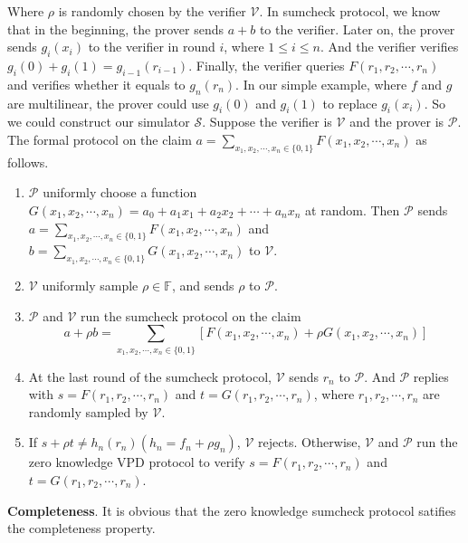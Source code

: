 Where $\rho$ is randomly chosen by the verifier $\mathcal{V}$. In sumcheck protocol, we know that in the beginning, the prover sends $a + b$ to the verifier. Later on, the prover sends $g_i(x_i)$ to the verifier in round $i$, where $1 \leq i \leq n$. And the verifier verifies $g_i(0) + g_i(1) = g_{i-1}(r_{i-1})$. Finally, the verifier queries $F(r_1, r_2, \cdots, r_n)$ and verifies whether it equals to $g_n(r_n)$. In our simple example, where $f$ and $g$ are multilinear, the prover could use $g_i(0)$ and $g_i(1)$ to replace $g_i(x_i)$. So we could construct our simulator $\mathcal{S}$. Suppose the verifier is $\mathcal{V}$ and the prover is $\mathcal{P}$. The formal protocol on the claim $a = \sum\limits_{x_1, x_2, \cdots, x_n \in \{0, 1\}} F(x_1, x_2, \cdots, x_n)$ as follows.\\

\noindent
\begin{enumerate}

\item $\mathcal{P}$ uniformly choose a function $G(x_1, x_2, \cdots, x_n) = a_0 + a_1x_1 + a_2x_2 + \cdots + a_nx_n$ at random. Then $\mathcal{P}$ sends $a = \sum\limits_{x_1, x_2, \cdots, x_n \in \{0, 1\}} F(x_1, x_2, \cdots, x_n)$ and $b = \sum\limits_{x_1, x_2, \cdots, x_n \in \{0, 1\}} G(x_1, x_2, \cdots, x_n)$ to $\mathcal{V}$.
\item $\mathcal{V}$ uniformly sample $\rho \in \mathbb{F}$, and sends $\rho$ to $\mathcal{P}$.
\item $\mathcal{P}$ and $\mathcal{V}$ run the sumcheck protocol on the claim
$$a + \rho b = \sum\limits_{x_1, x_2, \cdots, x_n \in \{0, 1\}}[F(x_1, x_2, \cdots, x_n) + \rho G(x_1, x_2, \cdots, x_n)]$$
\item At the last round of the sumcheck protocol, $\mathcal{V}$ sends $r_n$ to $\mathcal{P}$. And $\mathcal{P}$ replies with $s = F(r_1, r_2, \cdots, r_n)$ and $t = G(r_1, r_2, \cdots, r_n)$, where $r_1, r_2, \cdots, r_n$ are randomly sampled by $\mathcal{V}$. 
\item If $s + \rho t \neq h_n(r_n)(h_n = f_n + \rho g_n)$, $\mathcal{V}$ rejects. Otherwise, $\mathcal{V}$ and $\mathcal{P}$ run the zero knowledge VPD protocol to verify $s = F(r_1, r_2, \cdots, r_n)$ and $t = G(r_1, r_2, \cdots, r_n)$.  

\end{enumerate}
\noindent
\textbf{Completeness}. It is obvious that the zero knowledge sumcheck protocol satifies the completeness property.\\

